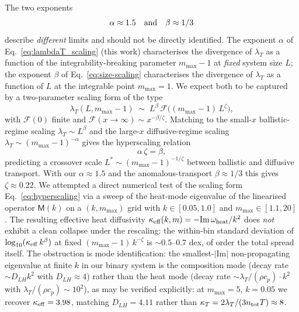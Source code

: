 \documentclass[aps,pre,twocolumn,superscriptaddress,longbibliography,floatfix]{revtex4-2}
\begin{document}
The two exponents
\begin{equation}
\alpha\approx 1.5\quad{\rm and}\quad\beta\approx 1/3
\nonumber
\end{equation}
describe \emph{different} limits and should not be directly
identified. The exponent $\alpha$ of
Eq.~\eqref{eq:lambdaT_scaling} (this work) characterises
the divergence of $\lambda_T$ as a function of the
integrability-breaking parameter $m_{\max}-1$ at \emph{fixed}
system size $L$; the exponent $\beta$ of
Eq.~\eqref{eq:size-scaling} characterises the divergence
of $\lambda_T$ as a function of $L$ at the integrable point
$m_{\max}=1$. We expect both to be captured by a
two-parameter scaling form of the type
\begin{equation}
\lambda_T(L, m_{\max}-1) \;\sim\;
L^{\beta}\,\mathcal{F}\!\bigl((m_{\max}-1)\,L^{\zeta}\bigr),
\label{eq:hyperscaling}
\end{equation}
with $\mathcal{F}(0)$ finite and
$\mathcal{F}(x\to\infty)\sim x^{-\beta/\zeta}$. Matching to
the small-$x$ ballistic-regime scaling
$\lambda_T\sim L^\beta$ and the large-$x$ diffusive-regime
scaling $\lambda_T\sim(m_{\max}-1)^{-\alpha}$ gives the
hyperscaling relation
\begin{equation}
\alpha\,\zeta = \beta,
\label{eq:hyperscaling-relation}
\end{equation}
predicting a crossover scale $L^*\sim(m_{\max}-1)^{-1/\zeta}$
between ballistic and diffusive transport. With our
$\alpha\approx 1.5$ and the anomalous-transport
$\beta\approx 1/3$ this gives $\zeta\approx 0.22$. We
attempted a direct numerical test of the scaling form
Eq.~\eqref{eq:hyperscaling} via a sweep of the heat-mode
eigenvalue of the linearised operator $\mathsf{M}(k)$ on a
$(k, m_{\max})$ grid with $k\in[0.05,1.0]$ and
$m_{\max}\in[1.1,20]$. The resulting effective heat
diffusivity $\kappa_{\rm eff}(k,m)=-\mathrm{Im}\,\omega_{\rm
heat}/k^{2}$ does \emph{not} exhibit a clean collapse under
the rescaling: the within-bin standard deviation of
$\log_{10}(\kappa_{\rm eff}\,k^{\beta})$ at fixed
$(m_{\max}-1)\,k^{-\zeta}$ is $\sim 0.5$--$0.7$ dex, of
order the total spread itself. The obstruction is mode
identification: the smallest-$|\mathrm{Im}|$
non-propagating eigenvalue at finite $k$ in our binary
system is the composition mode (decay rate $\sim D_{LH}k^2$
with $D_{LH}\approx 4$) rather than the heat mode (decay
rate $\sim \lambda_T/(\rho c_p)\cdot k^2$ with
$\lambda_T/(\rho c_p)\sim 10^{2}$), as may be verified
explicitly: at $m_{\max}=5$, $k=0.05$ we recover
$\kappa_{\rm eff}=3.98$, matching $D_{LH}=4.11$ rather than
$\kappa_{T}=2\lambda_T/(3 n_{\rm tot}T)\approx 8$.
\end{document}
